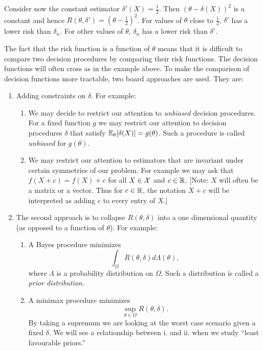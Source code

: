 Consider now the constant estimator $\delta'(X) = \frac{1}{2}$. Then $(\theta - \delta(X))^2$ is a constant and hence $R(\theta, \delta') = \left(\theta-\frac{1}{2}\right)^2$. For values of $\theta$ close to $\frac{1}{2}$, $\delta'$ has a lower risk than $\delta_n$. For other values of $\theta$, $\delta_n$ has a lower risk than $\delta'$.

The fact that the risk function is a function of $\theta$ means that it is difficult to compare two decision procedures by comparing their risk functions. The decision functions will often cross as in the example above. To make the comparison of decision functions more tractable, two board approaches are used. They are:

\begin{enumerate}
    \item Adding constraints on $\delta$. For example:
    \begin{enumerate}
        \item We may decide to restrict our attention to \emph{unbiased} decision procedures. For a fixed function $g$ we may restrict our attention to decision procedures $\delta$ that satisfy ${\mathbb{E}}_\theta[\delta(X)] = g(\theta)$. Such a procedure is called \emph{unbiased} for $g(\theta)$.
        \item We may restrict our attention to estimators that are invariant under certain symmetries of our problem. For example we may ask that $f(X+c) = f(X)+c$ for all $X \in {\mathcal{X}}$ and $c \in {\mathbb R}$. [Note: $X$ will often be a matrix or a vector. Thus for $c \in {\mathbb R}$, the notation $X+c$ will be interpreted as adding $c$ to every entry of $X$.]
    \end{enumerate}
    \item The second approach is to collapse $R(\theta,\delta)$ into a one dimensional quantity (as opposed to a function of $\theta$). For example:
    \begin{enumerate}
        \item A Bayes procedure minimizes 
        \[\int_\Omega R(\theta, \delta)d\Lambda(\theta), \]
        where $\Lambda$ is a probability distribution on $\Omega$. Such a distribution is called a \emph{prior distribution}.
        \item A minimax procedure minimizes
        \[\sup_{\theta \in \Omega}R(\theta,\delta). \]
        By taking a supremum we are looking at the worst case scenario given a fixed $\delta$. We will see a relationship between i. and ii. when we study ``least favourable priors.''
    \end{enumerate}
\end{enumerate}

